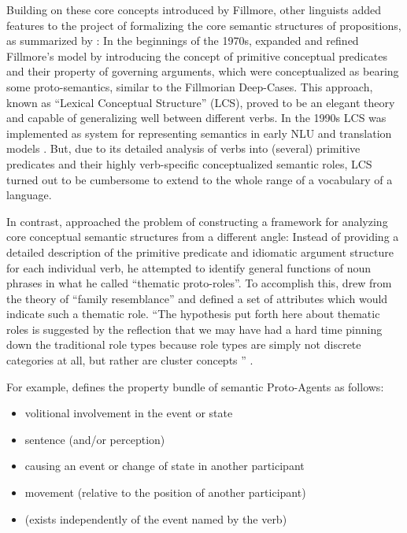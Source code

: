 Building on these core concepts introduced by Fillmore, other linguists added features to
the project of formalizing the core semantic structures of propositions, as summarized by
\citeauthor{palmer2010semantic}: In the beginnings of the 1970s, \cite{jackendoff1972semantic}
expanded and refined Fillmore's model by introducing the concept of primitive conceptual
predicates and their property of governing arguments, which were conceptualized as bearing
some proto-semantics, similar to the Fillmorian Deep-Cases. This approach, known as ``Lexical
Conceptual Structure'' (LCS), proved to be an elegant theory and capable of generalizing
well between different verbs. In the 1990s LCS was implemented as system for representing
semantics in early NLU and translation models \citep{palmer2010semantic}. But, due to its
detailed analysis of verbs into (several) primitive predicates and their highly verb-specific
conceptualized semantic roles, LCS turned out to be cumbersome to extend to the whole range of
a vocabulary of a language.

In contrast, \cite{dowty1991thematic} approached the problem of constructing a framework for
analyzing core conceptual semantic structures from a different angle: Instead of providing
a detailed description of the primitive predicate and idiomatic argument structure for each
individual verb, he attempted to identify general functions of noun phrases in what he called
``thematic proto-roles''. To accomplish this, \citeauthor{dowty1991thematic} drew from the
theory of ``family resemblance'' and defined a set of attributes which would indicate such
a thematic role. ``The hypothesis put forth here about thematic roles is suggested by the
reflection that we may have had a hard time pinning down the traditional role types because
role types are simply not discrete categories at all, but rather are cluster concepts
\textelp{}'' \citep[p.~571]{dowty1991thematic}.

For example, \citep[p.~572]{dowty1991thematic} defines the property bundle of semantic Proto-Agents
as follows:

\begin{itemize}
  \item volitional involvement in the event or state
  \item sentence (and/or perception)
  \item causing an event or change of state in another participant
  \item movement (relative to the position of another participant)
  \item (exists independently of the event named by the verb)
\end{itemize}

